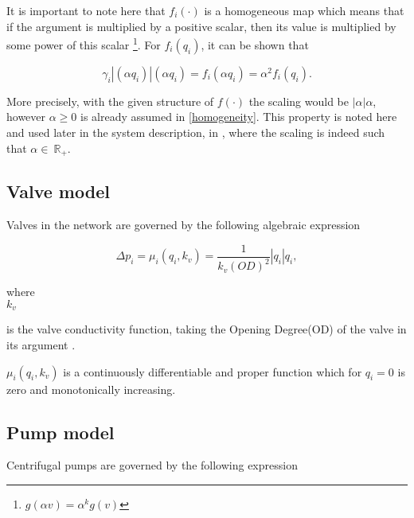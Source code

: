 It is important to note here that $f_i(\cdot)$ is a homogeneous map which means that if the argument is multiplied by a positive scalar, then its value is multiplied by some power of this scalar \footnote{$g(\alpha v) = \alpha^k g(v)$}. For $f_i(q_i)$, it can be shown that

\begin{equation}
  \label{homogeneity}
  \gamma_i |(\alpha q_i)|(\alpha q_i) = f_i(\alpha q_i) = \alpha^2 f_i(q_i).
\end{equation}

More precisely, with the given structure of $f(\cdot)$ the scaling would be $|\alpha|\alpha$, however $\alpha \geq 0$ is already assumed in \eqref{homogeneity}. 
This property is noted here and used later in the system description, in , where the scaling is indeed such that $\alpha \in \: \mathbb{R}_{+}$.

\subsection{Valve model}
\label{valve_component}

Valves in the network are governed by the following algebraic expression

\begin{equation}
\label{valvemodel}
 \Delta p_i = \mu_i(q_i,k_v) = \frac{1}{k_v(OD)^2} |q_i| q_i, 
\end{equation}

 \begin{minipage}[t]{0.20\textwidth}
where\\
\hspace*{8mm} $k_v$ 
\end{minipage}
\begin{minipage}[t]{0.68\textwidth}
\vspace*{2mm}
is the valve conductivity function, taking the Opening Degree(OD) of the valve in its argument \cite{8thsemester_project}.
\end{minipage}

$\mu_i(q_i,k_v)$ is a continuously differentiable and proper function which for $q_i = 0$ is zero and monotonically increasing.

\subsection{Pump model}
\label{pump_component}

Centrifugal pumps are governed by the following expression \cite{kallesoePHD}


